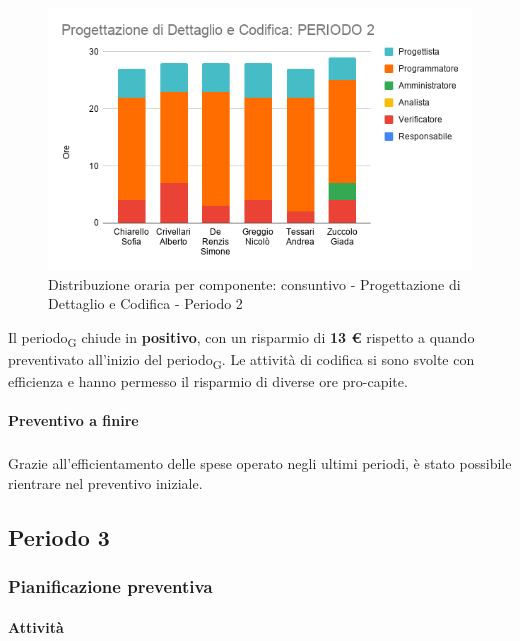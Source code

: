 \contabilitaTable{
	
}

\begin{figure}[H]
	\centering
	\includegraphics[scale=0.6]{res/images/charts/consuntivo/prog_dett_2.png}
	\caption{Distribuzione oraria per componente: consuntivo - Progettazione di Dettaglio e Codifica - Periodo 2}
\end{figure}


Il periodo\textsubscript{G} chiude in \textbf{positivo}, con un risparmio di \textbf{13 \euro} rispetto a quando preventivato all'inizio del periodo\textsubscript{G}. Le attività di codifica si sono svolte con efficienza e hanno permesso il risparmio di diverse ore pro-capite.


\paragraph{Preventivo a finire}
\subparagraph*{}

\pafTable{
	
}

Grazie all'efficientamento delle spese operato negli ultimi periodi, è stato possibile rientrare nel preventivo iniziale.


\pagebreak
\subsection{Periodo 3}

\subsubsection{Pianificazione preventiva}

\paragraph{Attività}
\subparagraph*{}

